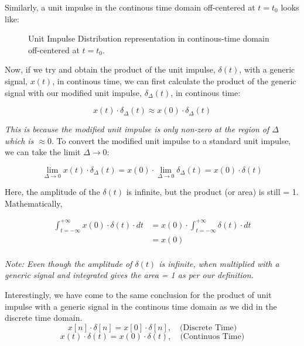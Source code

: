 \documentclass[letterpaper,12pt]{article}
\begin{document}
Similarly, a unit impulse in the continous time domain off-centered at $t=t_{0}$ looks like:

\begin{figure}[!ht]
    \centering
    
    \caption{Unit Impulse Distribution representation in continous-time domain off-centered at $t=t_{0}$.}\label{fig:unit_impulse_cont_off_centered}
\end{figure}

Now, if we try and obtain the product of the unit impulse, $\delta(t)$, with a generic signal, $x(t)$, in continous time, we can first calculate the product of the generic signal with our modified unit impulse, $\delta_{\Delta}(t)$, in continous time:

\[x(t)\cdot \delta_{\Delta}(t) \approx x(0)\cdot \delta_{\Delta}(t)\]

\textit{This is because the modified unit impulse is only non-zero at the region of $\Delta$ which is $\approx 0$}. To convert the modified unit impulse to a standard unit impulse, we can take the limit $\Delta \to 0$:

\[\lim_{\Delta \to 0} x(t) \cdot \delta_{\Delta}(t) = x(0) \cdot \lim_{\Delta \to 0} \delta_{\Delta}(t) = x(0) \cdot \delta(t)\]

Here, the amplitude of the $\delta(t)$ is infinite, but the product (or area) is still = 1. Mathematically,

\begin{equation*}
    \begin{aligned}
        \int_{t=-\infty}^{+\infty} x(0) \cdot \delta(t) \cdot dt & = x(0) \cdot \int_{t=-\infty}^{+\infty} \delta(t) \cdot dt \\
                                                                 & = x(0)                                                     \\
    \end{aligned}
\end{equation*}

\textit{Note: Even though the amplitude of $\delta(t)$ is infinite, when multiplied with a generic signal and integrated gives the area = 1 as per our definition.}

\vspace{0.5cm}
Interestingly, we have come to the same conclusion for the product of unit impulse with a generic signal in the continous time domain as we did in the discrete time domain.
\[x[n] \cdot \delta[n] = x[0] \cdot \delta[n], \quad \text{(Discrete Time)}\]
\[x(t) \cdot \delta(t) = x(0) \cdot \delta(t), \quad \text{(Continuos Time)}\]
\end{document}
